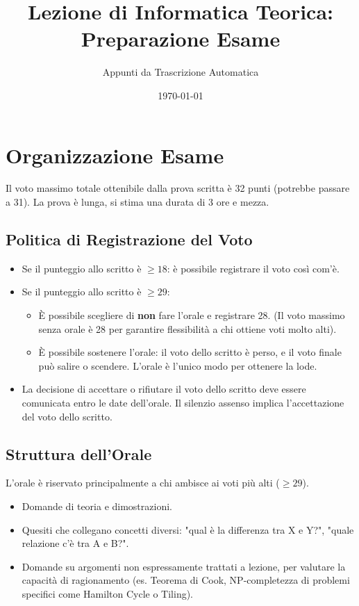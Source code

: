 \documentclass[a4paper]{article}
\title{Lezione di Informatica Teorica: Preparazione Esame}
\author{Appunti da Trascrizione Automatica}
\date{\today}
\begin{document}
\maketitle
\tableofcontents
\newpage

\section{Organizzazione Esame}
Il voto massimo totale ottenibile dalla prova scritta è 32 punti (potrebbe passare a 31).
La prova è lunga, si stima una durata di 3 ore e mezza.

\subsection{Politica di Registrazione del Voto}
\begin{itemize}
    \item Se il punteggio allo scritto è $\geq 18$: è possibile registrare il voto così com'è.
    \item Se il punteggio allo scritto è $\geq 29$:
    \begin{itemize}
        \item È possibile scegliere di \textbf{non} fare l'orale e registrare 28. (Il voto massimo senza orale è 28 per garantire flessibilità a chi ottiene voti molto alti).
        \item È possibile sostenere l'orale: il voto dello scritto è perso, e il voto finale può salire o scendere. L'orale è l'unico modo per ottenere la lode.
    \end{itemize}
    \item La decisione di accettare o rifiutare il voto dello scritto deve essere comunicata entro le date dell'orale. Il silenzio assenso implica l'accettazione del voto dello scritto.
\end{itemize}

\subsection{Struttura dell'Orale}
L'orale è riservato principalmente a chi ambisce ai voti più alti ($\geq 29$).
\begin{itemize}
    \item Domande di teoria e dimostrazioni.
    \item Quesiti che collegano concetti diversi: "qual è la differenza tra X e Y?", "quale relazione c'è tra A e B?".
    \item Domande su argomenti non espressamente trattati a lezione, per valutare la capacità di ragionamento (es. Teorema di Cook, NP-completezza di problemi specifici come Hamilton Cycle o Tiling).
\end{itemize}
\end{document}
